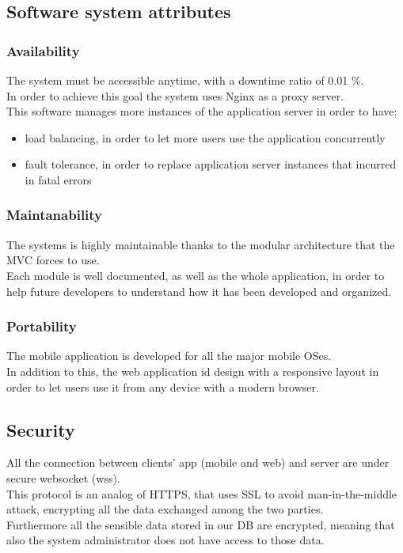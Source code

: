 \subsection{Software system attributes}

\subsubsection{Availability}
The system must be accessible anytime, with a downtime ratio of 0.01 \%.\\
In order to achieve this goal the system uses Nginx as a proxy server.\\
This software manages more instances of the application server in order to have:
\begin{itemize}
\item load balancing, in order to let more users use the application concurrently
\item fault tolerance, in order to replace application server instances that incurred in fatal errors
\end{itemize}
\subsubsection{Maintanability}
The systems is highly maintainable thanks to the modular architecture that the MVC forces to use.\\
Each module is well documented, as well as the whole application, in order to help future developers to understand how it has been developed and organized.

\subsubsection{Portability}
The mobile application is developed for all the major mobile OSes.\\
In addition to this, the web application id design with a responsive layout in order to let users use it from any device with a modern browser.

\subsection{Security}
All the connection between clients’ app (mobile and web) and server are under secure websocket (wss).\\
This protocol is an analog of HTTPS, that uses SSL to avoid man-in-the-middle attack, encrypting all the data exchanged among the two parties.\\
Furthermore all the sensible data stored in our DB are encrypted, meaning that also the system administrator does not have access to those data.
